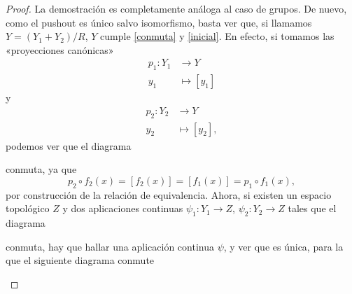 \documentclass[12pt,a4paper]{book}
\theoremstyle{definition} \newtheorem{defn}[thm]{Definición}
\theoremstyle{definition} \newtheorem{ejemplo}[thm]{Ejemplo}
\theoremstyle{definition} \newtheorem{ejercicio}[thm]{Ejercicio}
\theoremstyle{remark} \newtheorem*{obs}{Observación}
\begin{document}
\begin{proof}
  La demostración es completamente análoga al caso de grupos. De nuevo, como el pushout es único salvo isomorfismo, basta ver que, si llamamos $Y=(Y_1+Y_2)/R$, $Y$ cumple \ref{conmuta} y \ref{inicial}. En efecto, si tomamos las «proyecciones canónicas»
\begin{align*}
  p_1 :Y_1&\longrightarrow Y\\ 
  y_1 &\longmapsto [y_1] 
  \end{align*}
  y
\begin{align*}
  p_2 :Y_2&\longrightarrow Y\\ 
  y_2 &\longmapsto [y_2], 
  \end{align*}
  podemos ver que el diagrama
    \begin{center}
  \end{center}
  conmuta, ya que 
  \begin{equation*}
    p_2\circ f_2(x) = [f_2(x)]=[f_1(x)] = p_1\circ f_1 (x),
  \end{equation*}
  por construcción de la relación de equivalencia. Ahora, si existen un espacio topológico $Z$ y dos aplicaciones continuas $\psi_1:Y_1\rightarrow Z$, $\psi_2:Y_2\rightarrow Z$ tales que el diagrama 
    \begin{center}
  \end{center}
  conmuta, hay que hallar una aplicación continua $\psi$, y ver que es única, para la que el siguiente diagrama conmute
    \begin{center}
\end{center}
\end{proof}
\end{document}
